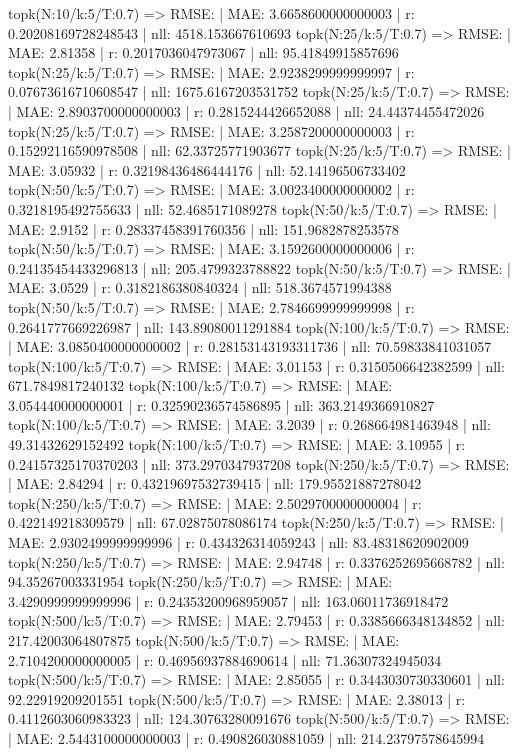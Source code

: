 topk(N:10/k:5/T:0.7) => RMSE: | MAE: 3.6658600000000003 | r: 0.20208169728248543 | nll: 4518.153667610693
topk(N:25/k:5/T:0.7) => RMSE: | MAE: 2.81358 | r: 0.2017036047973067 | nll: 95.41849915857696
topk(N:25/k:5/T:0.7) => RMSE: | MAE: 2.9238299999999997 | r: 0.07673616710608547 | nll: 1675.6167203531752
topk(N:25/k:5/T:0.7) => RMSE: | MAE: 2.8903700000000003 | r: 0.2815244426652088 | nll: 24.44374455472026
topk(N:25/k:5/T:0.7) => RMSE: | MAE: 3.2587200000000003 | r: 0.15292116590978508 | nll: 62.33725771903677
topk(N:25/k:5/T:0.7) => RMSE: | MAE: 3.05932 | r: 0.32198436486444176 | nll: 52.14196506733402
topk(N:50/k:5/T:0.7) => RMSE: | MAE: 3.0023400000000002 | r: 0.3218195492755633 | nll: 52.4685171089278
topk(N:50/k:5/T:0.7) => RMSE: | MAE: 2.9152 | r: 0.28337458391760356 | nll: 151.9682878253578
topk(N:50/k:5/T:0.7) => RMSE: | MAE: 3.1592600000000006 | r: 0.24135454433296813 | nll: 205.4799323788822
topk(N:50/k:5/T:0.7) => RMSE: | MAE: 3.0529 | r: 0.3182186380840324 | nll: 518.3674571994388
topk(N:50/k:5/T:0.7) => RMSE: | MAE: 2.7846699999999998 | r: 0.2641777669226987 | nll: 143.89080011291884
topk(N:100/k:5/T:0.7) => RMSE: | MAE: 3.0850400000000002 | r: 0.28153143193311736 | nll: 70.59833841031057
topk(N:100/k:5/T:0.7) => RMSE: | MAE: 3.01153 | r: 0.3150506642382599 | nll: 671.7849817240132
topk(N:100/k:5/T:0.7) => RMSE: | MAE: 3.054440000000001 | r: 0.32590236574586895 | nll: 363.2149366910827
topk(N:100/k:5/T:0.7) => RMSE: | MAE: 3.2039 | r: 0.268664981463948 | nll: 49.31432629152492
topk(N:100/k:5/T:0.7) => RMSE: | MAE: 3.10955 | r: 0.24157325170370203 | nll: 373.2970347937208
topk(N:250/k:5/T:0.7) => RMSE: | MAE: 2.84294 | r: 0.43219697532739415 | nll: 179.95521887278042
topk(N:250/k:5/T:0.7) => RMSE: | MAE: 2.5029700000000004 | r: 0.422149218309579 | nll: 67.02875078086174
topk(N:250/k:5/T:0.7) => RMSE: | MAE: 2.9302499999999996 | r: 0.434326314059243 | nll: 83.48318620902009
topk(N:250/k:5/T:0.7) => RMSE: | MAE: 2.94748 | r: 0.3376252695668782 | nll: 94.35267003331954
topk(N:250/k:5/T:0.7) => RMSE: | MAE: 3.4290999999999996 | r: 0.24353200968959057 | nll: 163.06011736918472
topk(N:500/k:5/T:0.7) => RMSE: | MAE: 2.79453 | r: 0.3385666348134852 | nll: 217.42003064807875
topk(N:500/k:5/T:0.7) => RMSE: | MAE: 2.7104200000000005 | r: 0.46956937884690614 | nll: 71.36307324945034
topk(N:500/k:5/T:0.7) => RMSE: | MAE: 2.85055 | r: 0.3443030730330601 | nll: 92.22919209201551
topk(N:500/k:5/T:0.7) => RMSE: | MAE: 2.38013 | r: 0.4112603060983323 | nll: 124.30763280091676
topk(N:500/k:5/T:0.7) => RMSE: | MAE: 2.5443100000000003 | r: 0.490826030881059 | nll: 214.23797578645994

